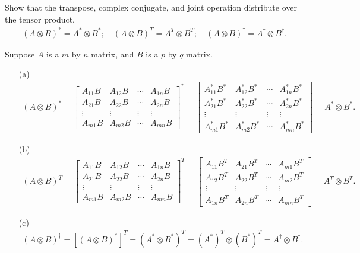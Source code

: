 \documentclass[en]{sol-man}
\begin{document}
\begin{exe}
    Show that the transpose, complex conjugate, and joint operation distribute over the tensor product,
    \begin{align}
        (A\otimes B)^*=A^*\otimes B^*;\quad(A\otimes B)^T=A^T\otimes B^T;\quad(A\otimes B)^{\dagger}=A^{\dagger}\otimes B^{\dagger}.
    \end{align}
\end{exe}
\begin{pf}
    Suppose $A$ is a $m$ by $n$ matrix, and $B$ is a $p$ by $q$ matrix.
    \begin{itemize}
        \item[(a)] 
        \begin{align}
            (A\otimes B)^*=\left[\begin{matrix}
                A_{11}B&A_{12}B&\cdots&A_{1n}B\\
                A_{21}B&A_{22}B&\cdots&A_{2n}B\\
                \vdots&\vdots&\vdots&\vdots\\
                A_{m1}B&A_{m2}B&\cdots&A_{mn}B
            \end{matrix}\right]^*=\left[\begin{matrix}
                A_{11}^*B^*&A_{12}^*B^*&\cdots&A_{1n}^*B^*\\
                A_{21}^*B^*&A_{22}^*B^*&\cdots&A_{2n}^*B^*\\
                \vdots&\vdots&\vdots&\vdots\\
                A_{m1}^*B^*&A_{m2}^*B^*&\cdots&A_{mn}^*B^*
            \end{matrix}\right]=A^*\otimes B^*.
        \end{align}
        \item[(b)] 
        \begin{align}
            (A\otimes B)^T=\left[\begin{matrix}
                A_{11}B&A_{12}B&\cdots&A_{1n}B\\
                A_{21}B&A_{22}B&\cdots&A_{2n}B\\
                \vdots&\vdots&\vdots&\vdots\\
                A_{m1}B&A_{m2}B&\cdots&A_{mn}B
            \end{matrix}\right]^T=\left[\begin{matrix}
                A_{11}B^T&A_{21}B^T&\cdots&A_{m1}B^T\\
                A_{12}B^T&A_{22}B^T&\cdots&A_{m2}B^T\\
                \vdots&\vdots&\vdots&\vdots\\
                A_{1n}B^T&A_{2n}B^T&\cdots&A_{mn}B^T
            \end{matrix}\right]=A^T\otimes B^T.
        \end{align}
        \item[(c)] 
        \begin{align}
            (A\otimes B)^{\dagger}=[(A\otimes B)^*]^T=(A^*\otimes B^*)^T=(A^*)^T\otimes(B^*)^T=A^{\dagger}\otimes B^{\dagger}.
        \end{align}
    \end{itemize}
\end{pf}
\end{document}
